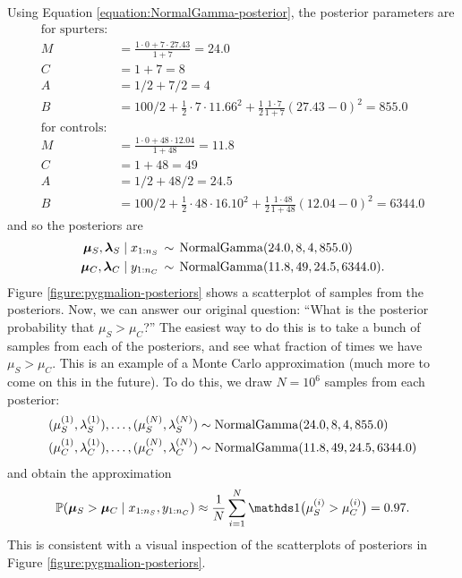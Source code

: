 \documentclass[12pt]{article}
\begin{document}
Using Equation \ref{equation:NormalGamma-posterior}, the posterior parameters are
\begin{align*}
\text{for spurters:} & \\
    M & =\frac{1\cdot 0 + 7 \cdot 27.43}{1 + 7} = 24.0\\
    C & = 1 + 7 = 8\\
    A & = 1/2 + 7/2 = 4\\ 
    B &= 100/2 + \tfrac{1}{2}\cdot 7\cdot 11.66^2 + \tfrac{1}{2}\frac{1\cdot 7}{1 + 7}(27.43 - 0)^2 = 855.0 \\
\text{for controls:} & \\
    M & =\frac{1\cdot 0 + 48\cdot 12.04}{1 + 48} = 11.8\\
    C & = 1 + 48 = 49\\
    A & = 1/2 + 48/2 = 24.5\\
    B &= 100/2 + \tfrac{1}{2}\cdot 48\cdot 16.10^2 + \tfrac{1}{2}\frac{1\cdot 48}{1 + 48}(12.04 - 0)^2 = 6344.0
\end{align*}
and so the posteriors are
\begin{align*}
\bm\mu_S,\bm\lambda_S\mid x_{1:n_S} &\,\sim\,\operatorname*{NormalGamma}(24.0,8,4,855.0)\\
\bm\mu_C,\bm\lambda_C\mid y_{1:n_C} &\,\sim\,\operatorname*{NormalGamma}(11.8,49,24.5,6344.0).
\end{align*}
Figure \ref{figure:pygmalion-posteriors} shows a scatterplot of samples from the posteriors. Now, we can answer our original question: ``What is the posterior probability that $\mu_S>\mu_C$?'' The easiest way to do this is to take a bunch of samples from each of the posteriors, and see what fraction of times we have $\mu_S>\mu_C$. This is an example of a Monte Carlo approximation (much more to come on this in the future). To do this, we draw $N=10^6$ samples from each posterior:
\begin{align*}
&(\mu_S^{(1)},\lambda_S^{(1)}),\dotsc,(\mu_S^{(N)},\lambda_S^{(N)})\sim \operatorname*{NormalGamma}(24.0,8,4,855.0)\\
&(\mu_C^{(1)},\lambda_C^{(1)}),\dotsc,(\mu_C^{(N)},\lambda_C^{(N)})\sim\operatorname*{NormalGamma}(11.8,49,24.5,6344.0)
\end{align*}
and obtain the approximation
\begin{align*}
\Pr(\bm\mu_S > \bm\mu_C \mid x_{1:n_S},y_{1:n_C}) 
\approx \frac{1}{N} \sum_{i = 1}^N \I\big(\mu_S^{(i)}>\mu_C^{(i)}\big) = 0.97.
\end{align*}
This is consistent with a visual inspection of the scatterplots of posteriors in Figure \ref{figure:pygmalion-posteriors}.
\end{document}
